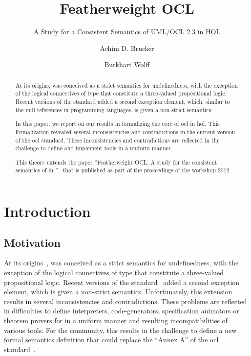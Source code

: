 \documentclass[11pt,a4paper,openright,twoside,abstracton]{scrreprt}
\begin{document}
\title{Featherweight OCL}
\subtitle{A Study for a Consistent Semantics of UML/OCL 2.3 in HOL}
\subject{Extended Version}
\author{Achim D. Brucker \and Burkhart Wolff}


\maketitle

\begin{abstract}
  At its origins, \OCL was conceived as a strict semantics for
  undefinedness, with the exception of the logical connectives of type
   that constitute a three-valued propositional
  logic.  Recent versions of the \OCL standard added a second
  exception element, which, similar to the null references in
  programming languages, is given a non-strict semantics.

  In this paper, we report on our results in formalizing the core of
  \acs{ocl} in \acf{hol}. This formalization revealed several
  inconsistencies and contradictions in the current version of the
  \acs{ocl} standard.  These inconsistencies and contradictions are
  reflected in the challenge to define and implement \OCL tools in a
  uniform manner.


  
  \vspace{1cm} This theory extends the paper
  ``Featherweight OCL: A study for the consistent semantics of 
  in \HOL''~\cite{brucker.ea:featherweight:2012} that is published as
  part of the proceedings of the \OCL workshop 2012.
\end{abstract}



\tableofcontents

\part{Introduction}
\chapter{Motivation}
At its origins~\cite{richters:precise:2002,omg:ocl:1997}, \OCL was
conceived as a strict semantics for undefinedness, with the exception
of the logical connectives of type  that constitute
a three-valued propositional logic.  Recent versions of the \OCL
standard~\cite{omg:ocl:2006,omg:ocl:2012} added a second exception
element, which is given a non-strict semantics.  Unfortunately, this
extension results in several inconsistencies and contradictions. These
problems are reflected in difficulties to define interpreters,
code-generators, specification animators or theorem provers for \OCL
in a uniform manner and resulting incompatibilities of various
tools. For the \OCL community, this results in the challenge to define
a new formal semantics definition \OCL that could replace the ``Annex
A'' of the \acs{ocl} standard~\cite{omg:ocl:2012}.
\end{document}
